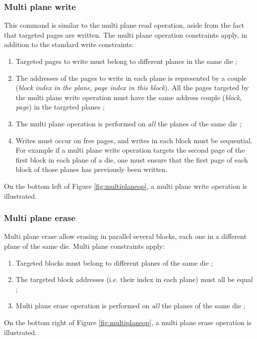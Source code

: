 \subsubsection{Multi plane write}
This command is similar to the multi plane read operation, aside from the fact that targeted pages are written. The multi plane operation constraints apply, in addition to the standard write constraints:

\begin{enumerate}
  \item Targeted pages to write must belong to different planes in the same die ;
  \item The addresses of the pages to write in each plane is represented by a couple (\emph{block index in the plane}, \emph{page index in this block}). All the pages targeted by the multi plane write operation must have the same address couple (\emph{block}, \emph{page}) in the targeted planes ;
  \item The multi plane operation is performed on \emph{all} the planes of the same die ;
  \item Writes must occur on free pages, and writes in each block must be sequential. For example if a multi plane write operation targets the second page of the first block in each plane of a die, one must ensure that the first page of each block of those planes has previously been written.
\end{enumerate}

On the bottom left of Figure \ref{fig:multiplaneop}, a multi plane write operation is illustrated.

\subsubsection{Multi plane erase}
Multi plane erase allow erasing in parallel several blocks, each one in a different plane of the same die. Multi plane constraints apply:

\begin{enumerate}
  \item Targeted blocks must belong to different planes of the same die ;
  \item The targeted block addresses (i.e. their index in each plane) must all be equal ;
  \item Multi plane erase operation is performed on \emph{all} the planes of the same die ;
\end{enumerate}

On the bottom right of Figure \ref{fig:multiplaneop}, a multi plane erase operation is illustrated.

